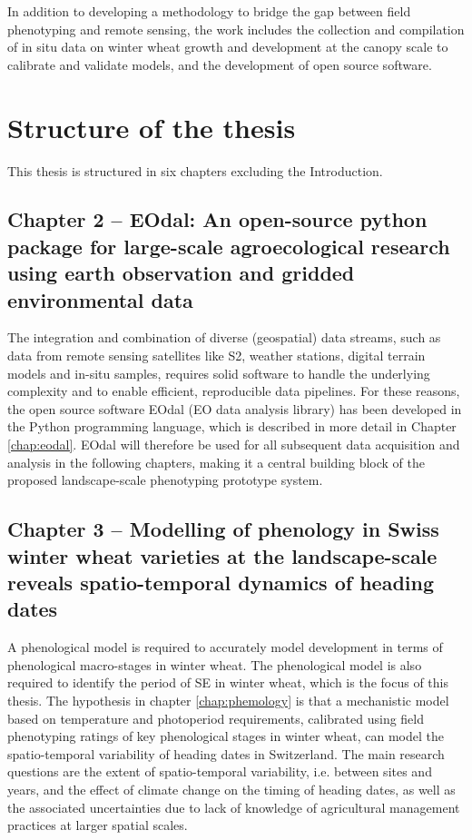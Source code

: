 In addition to developing a methodology to bridge the gap between field phenotyping and remote sensing, the work includes the collection and compilation of in situ data on winter wheat growth and development at the canopy scale to calibrate and validate models, and the development of open source software.

\section{Structure of the thesis}

This thesis is structured in six chapters excluding the Introduction.

\subsection*{Chapter 2 -- EOdal: An open-source python package for large-scale agroecological research using earth observation and gridded environmental data}
The integration and combination of diverse (geospatial) data streams, such as data from remote sensing satellites like \gls{S2}, weather stations, digital terrain models and in-situ samples, requires solid software to handle the underlying complexity and to enable efficient, reproducible data pipelines. For these reasons, the open source software EOdal (\gls{EO} data analysis library) has been developed in the Python programming language, which is described in more detail in Chapter \ref{chap:eodal}. EOdal will therefore be used for all subsequent data acquisition and analysis in the following chapters, making it a central building block of the proposed landscape-scale phenotyping prototype system.

\subsection*{Chapter 3 -- Modelling of phenology in Swiss winter wheat varieties at the landscape-scale reveals spatio-temporal dynamics of heading dates}
A phenological model is required to accurately model development in terms of phenological macro-stages in winter wheat. The phenological model is also required to identify the period of \gls{SE} in winter wheat, which is the focus of this thesis. The hypothesis in chapter \ref{chap:phemology} is that a mechanistic model based on temperature and photoperiod requirements, calibrated using field phenotyping ratings of key phenological stages in winter wheat, can model the spatio-temporal variability of heading dates in Switzerland. The main research questions are the extent of spatio-temporal variability, i.e. between sites and years, and the effect of climate change on the timing of heading dates, as well as the associated uncertainties due to lack of knowledge of agricultural management practices at larger spatial scales.

